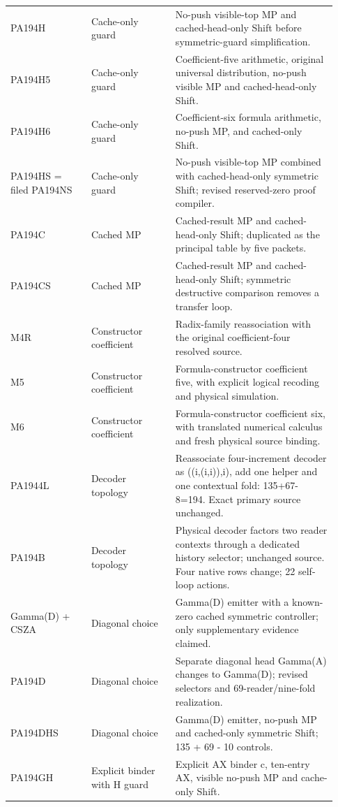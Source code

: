 \begin{longtable}{>{\raggedright\arraybackslash}p{0.23\linewidth}>{\raggedright\arraybackslash}p{0.24\linewidth}>{\raggedright\arraybackslash}p{0.46\linewidth}}
PA194H&Cache-only guard&No-push visible-top MP and cached-head-only Shift before symmetric-guard simplification.\\[5pt]
PA194H5&Cache-only guard&Coefficient-five arithmetic, original universal distribution, no-push visible MP and cached-head-only Shift.\\[5pt]
PA194H6&Cache-only guard&Coefficient-six formula arithmetic, no-push MP, and cached-only Shift.\\[5pt]
PA194HS = filed PA194NS&Cache-only guard&No-push visible-top MP combined with cached-head-only symmetric Shift; revised reserved-zero proof compiler.\\[5pt]
PA194C&Cached MP&Cached-result MP and cached-head-only Shift; duplicated as the principal table by five packets.\\[5pt]
PA194CS&Cached MP&Cached-result MP and cached-head-only Shift; symmetric destructive comparison removes a transfer loop.\\[5pt]
M4R&Constructor coefficient&Radix-family reassociation with the original coefficient-four resolved source.\\[5pt]
M5&Constructor coefficient&Formula-constructor coefficient five, with explicit logical recoding and physical simulation.\\[5pt]
M6&Constructor coefficient&Formula-constructor coefficient six, with translated numerical calculus and fresh physical source binding.\\[5pt]
PA1944L&Decoder topology&Reassociate four-increment decoder as ((i,(i,i)),i), add one helper and one contextual fold: 135+67-8=194. Exact primary source unchanged.\\[5pt]
PA194B&Decoder topology&Physical decoder factors two reader contexts through a dedicated history selector; unchanged source. Four native rows change; 22 self-loop actions.\\[5pt]
Gamma(D) + CSZA&Diagonal choice&Gamma(D) emitter with a known-zero cached symmetric controller; only supplementary evidence claimed.\\[5pt]
PA194D&Diagonal choice&Separate diagonal head Gamma(A) changes to Gamma(D); revised selectors and 69-reader/\allowbreak{}nine-fold realization.\\[5pt]
PA194DHS&Diagonal choice&Gamma(D) emitter, no-push MP and cached-only symmetric Shift; 135 + 69 - 10 controls.\\[5pt]
PA194GH&Explicit binder with H guard&Explicit AX binder c, ten-entry AX, visible no-push MP and cache-only Shift.\\[5pt]

\end{longtable}
